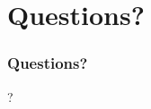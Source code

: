\documentclass[xcolor=dvipsnames]{beamer}
\begin{document}
\section{Questions?}

\begin{frame}
\frametitle{Questions?}
\begin{center}
\Huge{?}
\end{center}
\end{frame}
\end{document}

